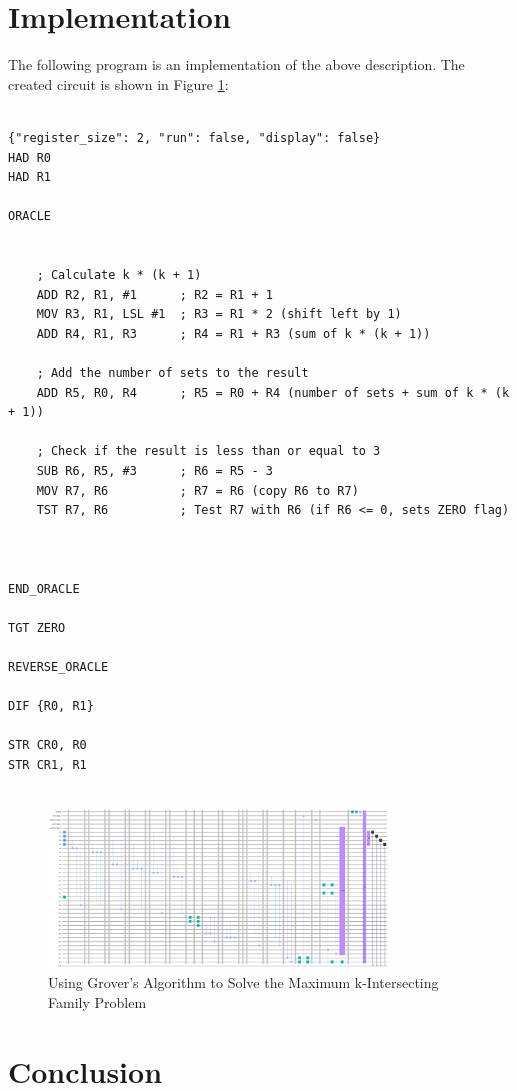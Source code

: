 \section{Implementation}

The following program is an implementation of the above description. The created circuit is shown in Figure \ref{fig:Maximum_k-Intersecting_Family}:

\begin{lstlisting}

{"register_size": 2, "run": false, "display": false}
HAD R0
HAD R1

ORACLE


    ; Calculate k * (k + 1)
    ADD R2, R1, #1      ; R2 = R1 + 1
    MOV R3, R1, LSL #1  ; R3 = R1 * 2 (shift left by 1)
    ADD R4, R1, R3      ; R4 = R1 + R3 (sum of k * (k + 1))
    
    ; Add the number of sets to the result
    ADD R5, R0, R4      ; R5 = R0 + R4 (number of sets + sum of k * (k + 1))
    
    ; Check if the result is less than or equal to 3
    SUB R6, R5, #3      ; R6 = R5 - 3
    MOV R7, R6          ; R7 = R6 (copy R6 to R7)
    TST R7, R6          ; Test R7 with R6 (if R6 <= 0, sets ZERO flag)



END_ORACLE

TGT ZERO

REVERSE_ORACLE

DIF {R0, R1}

STR CR0, R0
STR CR1, R1


\end{lstlisting}

\begin{figure}[htp]
    \centering
    \includegraphics[width=9cm]{Figures/Maximum_k-Intersecting_Family_circuit.png}
    \caption{Using Grover's Algorithm to Solve the Maximum k-Intersecting Family Problem}
    \label{fig:Maximum_k-Intersecting_Family}
\end{figure}

\section{Conclusion}
\label{sec:conclusion}

